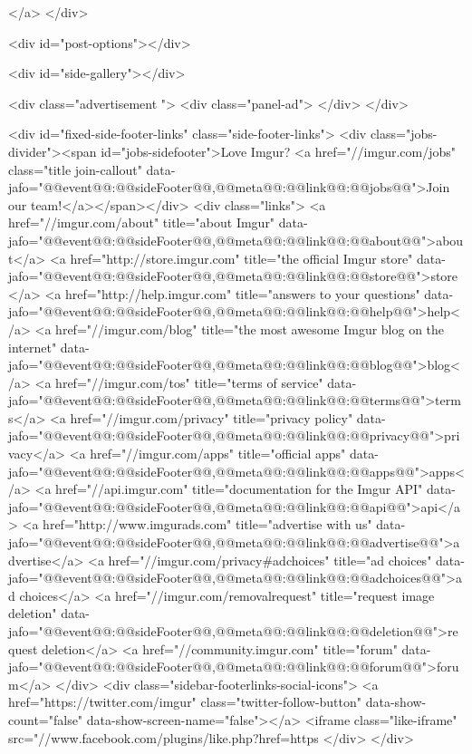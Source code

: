                 </a>
            </div>

            <div id="post-options"></div>

            <div id="side-gallery"></div>

                            

                
            

                                                <div class="advertisement ">
                        <div class="panel-ad">
                        </div>
                    </div>
                
            

            

            <div id="fixed-side-footer-links" class="side-footer-links">
    <div class="jobs-divider"><span id="jobs-sidefooter">Love Imgur? <a href="//imgur.com/jobs" class="title join-callout" data-jafo="{@@event@@:@@sideFooter@@,@@meta@@:{@@link@@:@@jobs@@}}">Join our team!</a></span></div>
    <div class="links">
        <a href="//imgur.com/about" title="about Imgur" data-jafo="{@@event@@:@@sideFooter@@,@@meta@@:{@@link@@:@@about@@}}">about</a>
        <a href="http://store.imgur.com" title="the official Imgur store" data-jafo="{@@event@@:@@sideFooter@@,@@meta@@:{@@link@@:@@store@@}}">store</a>
        <a href="http://help.imgur.com" title="answers to your questions" data-jafo="{@@event@@:@@sideFooter@@,@@meta@@:{@@link@@:@@help@@}}">help</a>
        <a href="//imgur.com/blog" title="the most awesome Imgur blog on the internet" data-jafo="{@@event@@:@@sideFooter@@,@@meta@@:{@@link@@:@@blog@@}}">blog</a>
        <a href="//imgur.com/tos" title="terms of service" data-jafo="{@@event@@:@@sideFooter@@,@@meta@@:{@@link@@:@@terms@@}}">terms</a>
        <a href="//imgur.com/privacy" title="privacy policy" data-jafo="{@@event@@:@@sideFooter@@,@@meta@@:{@@link@@:@@privacy@@}}">privacy</a>
        <a href="//imgur.com/apps" title="official apps" data-jafo="{@@event@@:@@sideFooter@@,@@meta@@:{@@link@@:@@apps@@}}">apps</a>
        <a href="//api.imgur.com" title="documentation for the Imgur API" data-jafo="{@@event@@:@@sideFooter@@,@@meta@@:{@@link@@:@@api@@}}">api</a>
        <a href="http://www.imgurads.com" title="advertise with us" data-jafo="{@@event@@:@@sideFooter@@,@@meta@@:{@@link@@:@@advertise@@}}">advertise</a>
        <a href="//imgur.com/privacy#adchoices" title="ad choices" data-jafo="{@@event@@:@@sideFooter@@,@@meta@@:{@@link@@:@@adchoices@@}}">ad choices</a>
        <a href="//imgur.com/removalrequest" title="request image deletion" data-jafo="{@@event@@:@@sideFooter@@,@@meta@@:{@@link@@:@@deletion@@}}">request deletion</a>
        <a href="//community.imgur.com" title="forum" data-jafo="{@@event@@:@@sideFooter@@,@@meta@@:{@@link@@:@@forum@@}}">forum</a>
    </div>
    <div class="sidebar-footerlinks-social-icons">
        <a href="https://twitter.com/imgur" class="twitter-follow-button" data-show-count="false" data-show-screen-name="false"></a>
        <iframe class="like-iframe" src="//www.facebook.com/plugins/like.php?href=https%
    </div>
</div>

